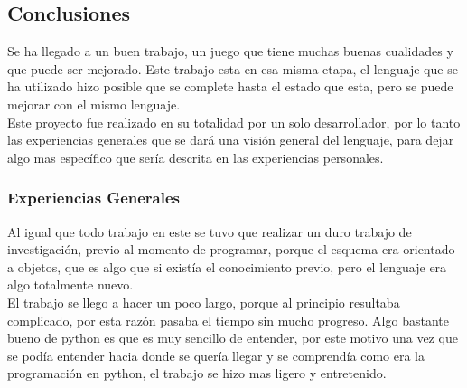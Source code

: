 \documentclass[10pt]{article}
\begin{document}
{\begin{flushleft}
\newpage
\subsection{Conclusiones}
Se ha llegado a un buen trabajo, un juego que tiene muchas buenas cualidades y que puede ser mejorado. Este trabajo esta en esa misma etapa, el lenguaje que se ha utilizado hizo posible que se complete hasta el estado que esta, pero se puede mejorar con el mismo lenguaje.\\
Este proyecto fue realizado en su totalidad por un solo desarrollador, por lo tanto las experiencias generales que se dar\'a una visi\'on general del lenguaje, para dejar algo mas espec\'ifico que ser\'ia descrita en las experiencias personales.
\subsubsection{Experiencias Generales}
Al igual que todo trabajo en este se tuvo que realizar un duro trabajo de investigaci\'on, previo al momento de programar, porque el esquema era orientado a objetos, que es algo que si exist\'ia el conocimiento previo, pero el lenguaje era algo totalmente nuevo.\\
El trabajo se llego a hacer un poco largo, porque al principio resultaba complicado, por esta raz\'on pasaba el tiempo sin mucho progreso.
Algo bastante bueno de python es que es muy sencillo de entender, por este motivo una vez que se pod\'ia entender hacia donde se quer\'ia llegar y se comprend\'ia como era la programaci\'on en python, el trabajo se hizo mas ligero y entretenido.\\


\end{flushleft}}
\end{document}
